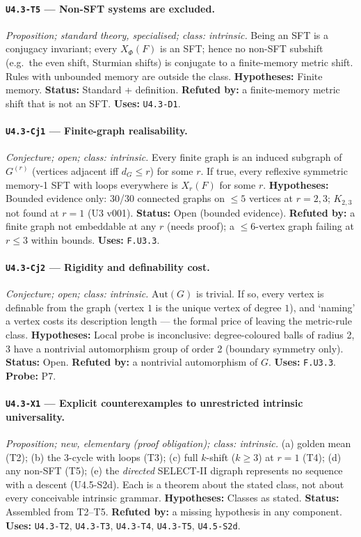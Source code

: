 \documentclass[11pt]{article}
\begin{document}
\paragraph{\texttt{U4.3-T5} --- Non-SFT systems are excluded.} \emph{Proposition; standard theory, specialised; class: intrinsic.} Being an SFT is a conjugacy invariant; every $X_\Phi(F)$ is an SFT; hence no non-SFT subshift (e.g.\ the even shift, Sturmian shifts) is conjugate to a finite-memory metric shift. Rules with unbounded memory are outside the class. \textbf{Hypotheses:} Finite memory. \textbf{Status:} Standard + definition. \textbf{Refuted by:} a finite-memory metric shift that is not an SFT. \textbf{Uses:} \texttt{U4.3-D1}.

\paragraph{\texttt{U4.3-Cj1} --- Finite-graph realisability.} \emph{Conjecture; open; class: intrinsic.} Every finite graph is an induced subgraph of $G^{(r)}$ (vertices adjacent iff $d_G\le r$) for some $r$. If true, every reflexive symmetric memory-1 SFT with loops everywhere is $X_r(F)$ for some $r$. \textbf{Hypotheses:} Bounded evidence only: 30/30 connected graphs on $\le5$ vertices at $r=2,3$; $K_{2,3}$ not found at $r=1$ (U3 v001). \textbf{Status:} Open (bounded evidence). \textbf{Refuted by:} a finite graph not embeddable at any $r$ (needs proof); a $\le6$-vertex graph failing at $r\le3$ within bounds. \textbf{Uses:} \texttt{F.U3.3}.

\paragraph{\texttt{U4.3-Cj2} --- Rigidity and definability cost.} \emph{Conjecture; open; class: intrinsic.} $\mathrm{Aut}(G)$ is trivial. If so, every vertex is definable from the graph (vertex $1$ is the unique vertex of degree $1$), and `naming' a vertex costs its description length --- the formal price of leaving the metric-rule class. \textbf{Hypotheses:} Local probe is inconclusive: degree-coloured balls of radius 2, 3 have a nontrivial automorphism group of order 2 (boundary symmetry only). \textbf{Status:} Open. \textbf{Refuted by:} a nontrivial automorphism of $G$. \textbf{Uses:} \texttt{F.U3.3}. \textbf{Probe:} P7.

\paragraph{\texttt{U4.3-X1} --- Explicit counterexamples to unrestricted intrinsic universality.} \emph{Proposition; new, elementary (proof obligation); class: intrinsic.} (a) golden mean (T2); (b) the 3-cycle with loops (T3); (c) full $k$-shift ($k\ge3$) at $r=1$ (T4); (d) any non-SFT (T5); (e) the \emph{directed} SELECT-II digraph represents no sequence with a descent (U4.5-S2d). Each is a theorem about the stated class, not about every conceivable intrinsic grammar. \textbf{Hypotheses:} Classes as stated. \textbf{Status:} Assembled from T2--T5. \textbf{Refuted by:} a missing hypothesis in any component. \textbf{Uses:} \texttt{U4.3-T2}, \texttt{U4.3-T3}, \texttt{U4.3-T4}, \texttt{U4.3-T5}, \texttt{U4.5-S2d}.
\end{document}

